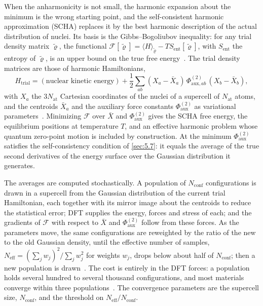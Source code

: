 When the anharmonicity is not small, the harmonic expansion about the minimum is the wrong starting point, and the self-consistent harmonic approximation (SCHA) replaces it by the best harmonic description of the actual distribution of nuclei. Its basis is the Gibbs--Bogoliubov inequality: for any trial density matrix $\tilde\varrho$, the functional $\mathcal{F}[\tilde\varrho] = \langle H\rangle_{\tilde\varrho} - TS_{\mathrm{ent}}[\tilde\varrho]$, with $S_{\mathrm{ent}}$ the entropy of $\tilde\varrho$, is an upper bound on the true free energy~\cite[Eq.~(2)]{monacelli2021stochastic}. The trial density matrices are those of harmonic Hamiltonians,
\begin{equation}
  H_{\mathrm{trial}} = (\text{nuclear kinetic energy}) + \frac12\sum_{ab}(X_a - \bar X_a)\,\Phi^{(2)}_{\mathrm{aux},ab}\,(X_b - \bar X_b) ,
  \label{eq:E.8-scha}
\end{equation}
with $X_a$ the $3N_{\mathrm{at}}$ Cartesian coordinates of the nuclei of a supercell of $N_{\mathrm{at}}$ atoms, and the centroids $\bar X_a$ and the auxiliary force constants $\Phi^{(2)}_{\mathrm{aux}}$ as variational parameters~\cite[Eqs.~(4) and~(7)]{monacelli2021stochastic}. Minimizing $\mathcal{F}$ over $\bar X$ and $\Phi^{(2)}_{\mathrm{aux}}$ gives the SCHA free energy, the equilibrium positions at temperature $T$, and an effective harmonic problem whose quantum zero-point motion is included by construction. At the minimum $\Phi^{(2)}_{\mathrm{aux}}$ satisfies the self-consistency condition of \cref{sec:5.7}: it equals the average of the true second derivatives of the energy surface over the Gaussian distribution it generates.

The averages are computed stochastically. A population of $N_{\mathrm{conf}}$ configurations is drawn in a supercell from the Gaussian distribution of the current trial Hamiltonian, each together with its mirror image about the centroids to reduce the statistical error; DFT supplies the energy, forces and stress of each; and the gradients of $\mathcal{F}$ with respect to $\bar X$ and $\Phi^{(2)}_{\mathrm{aux}}$ follow from these forces. As the parameters move, the same configurations are reweighted by the ratio of the new to the old Gaussian density, until the effective number of samples, $N_{\mathrm{eff}} = (\sum_jw_j)^2/\sum_jw_j^2$ for weights $w_j$, drops below about half of $N_{\mathrm{conf}}$; then a new population is drawn~\cite[Eqs.~(21), (38) and~(39)]{monacelli2021stochastic}. The cost is entirely in the DFT forces: a population holds several hundred to several thousand configurations, and most materials converge within three populations~\cite[Sect.~III\,B]{monacelli2021stochastic}. The convergence parameters are the supercell size, $N_{\mathrm{conf}}$, and the threshold on $N_{\mathrm{eff}}/N_{\mathrm{conf}}$.

